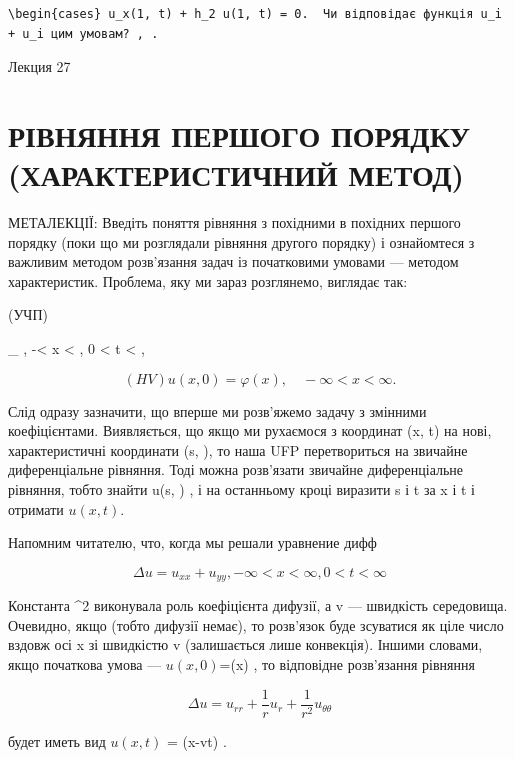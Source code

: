 \documentclass[
  ukrainian,
]{article}
\begin{document}
\begin{verbatim}
\begin{cases} u_x(1, t) + h_2 u(1, t) = 0.  Чи відповідає функція u_i + u_i цим умовам? , .
\end{verbatim}

Лекция 27

\section{РІВНЯННЯ ПЕРШОГО ПОРЯДКУ (ХАРАКТЕРИСТИЧНИЙ
МЕТОД)}\label{ux440ux456ux432ux43dux44fux43dux43dux44f-ux43fux435ux440ux448ux43eux433ux43e-ux43fux43eux440ux44fux434ux43aux443-ux445ux430ux440ux430ux43aux442ux435ux440ux438ux441ux442ux438ux447ux43dux438ux439-ux43cux435ux442ux43eux434}

МЕТАЛЕКЦІЇ: Введіть поняття рівняння з похідними в похідних першого
порядку (поки що ми розглядали рівняння другого порядку) і ознайомтеся з
важливим методом розв'язання задач із початковими умовами --- методом
характеристик. Проблема, яку ми зараз розглянемо, виглядає так:

(УЧП)

\_ \textbar, -\infty \textless{} x \textless{} \infty  , 0 \textless{} t
\textless{} \infty  ,

\[
(HV)   u(x, 0) = \varphi(x), \quad -\infty < x < \infty.
\]

Слід одразу зазначити, що вперше ми розв'яжемо задачу з змінними
коефіцієнтами. Виявляється, що якщо ми рухаємося з координат (x, t) на
нові, характеристичні координати (s, \tau), то наша UFP перетвориться на
звичайне диференціальне рівняння. Тоді можна розв'язати звичайне
диференціальне рівняння, тобто знайти u(s, \tau) , і на останньому кроці
виразити s і t за x і t і отримати \(u(x, t)\).

Напомним читателю, что, когда мы решали уравнение дифф

\[
\Delta u = u_{xx} + u_{yy},   -\infty < x < \infty  ,   0 < t < \infty
\]

Константа \alpha\^{}2 виконувала роль коефіцієнта дифузії, а v ---
швидкість середовища. Очевидно, якщо  (тобто дифузії немає), то
розв'язок буде зсуватися як ціле число вздовж осі x зі швидкістю v
(залишається лише конвекція). Іншими словами, якщо початкова умова ---
\(u(x,0)\)=\varphi(x) , то відповідне розв'язання рівняння

\[
\Delta u = u_{rr} + \frac{1}{r}u_r + \frac{1}{r^2}u_{\theta\theta}
\]

будет иметь вид \(u(x, t)\) = \varphi(x-vt) .
\end{document}
